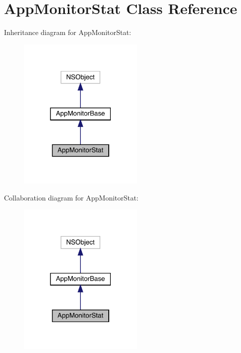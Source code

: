 \hypertarget{interface_app_monitor_stat}{}\section{App\+Monitor\+Stat Class Reference}
\label{interface_app_monitor_stat}


Inheritance diagram for App\+Monitor\+Stat\+:\nopagebreak
\begin{figure}[H]
\begin{center}
\leavevmode
\includegraphics[width=170pt]{interface_app_monitor_stat__inherit__graph}
\end{center}
\end{figure}


Collaboration diagram for App\+Monitor\+Stat\+:\nopagebreak
\begin{figure}[H]
\begin{center}
\leavevmode
\includegraphics[width=170pt]{interface_app_monitor_stat__coll__graph}
\end{center}
\end{figure}
